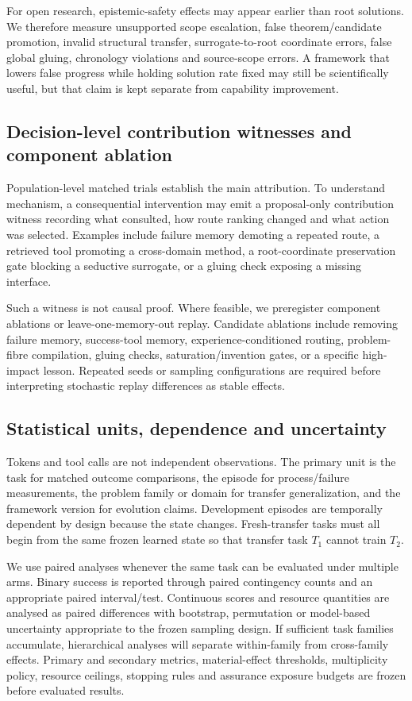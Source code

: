For open research, epistemic-safety effects may appear earlier than root solutions. We therefore measure unsupported scope escalation, false theorem/candidate promotion, invalid structural transfer, surrogate-to-root coordinate errors, false global gluing, chronology violations and source-scope errors. A framework that lowers false progress while holding solution rate fixed may still be scientifically useful, but that claim is kept separate from capability improvement.

\subsection{Decision-level contribution witnesses and component ablation}

Population-level matched trials establish the main attribution. To understand mechanism, a consequential intervention may emit a proposal-only contribution witness recording what \RAKL{} consulted, how route ranking changed and what action was selected. Examples include failure memory demoting a repeated route, a retrieved tool promoting a cross-domain method, a root-coordinate preservation gate blocking a seductive surrogate, or a gluing check exposing a missing interface.

Such a witness is not causal proof. Where feasible, we preregister component ablations or leave-one-memory-out replay. Candidate ablations include removing failure memory, success-tool memory, experience-conditioned routing, problem-fibre compilation, gluing checks, saturation/invention gates, or a specific high-impact lesson. Repeated seeds or sampling configurations are required before interpreting stochastic replay differences as stable effects.

\subsection{Statistical units, dependence and uncertainty}

Tokens and tool calls are not independent observations. The primary unit is the task for matched outcome comparisons, the episode for process/failure measurements, the problem family or domain for transfer generalization, and the framework version for evolution claims. Development episodes are temporally dependent by design because the state changes. Fresh-transfer tasks must all begin from the same frozen learned state so that transfer task $T_1$ cannot train $T_2$.

We use paired analyses whenever the same task can be evaluated under multiple arms. Binary success is reported through paired contingency counts and an appropriate paired interval/test. Continuous scores and resource quantities are analysed as paired differences with bootstrap, permutation or model-based uncertainty appropriate to the frozen sampling design. If sufficient task families accumulate, hierarchical analyses will separate within-family from cross-family effects. Primary and secondary metrics, material-effect thresholds, multiplicity policy, resource ceilings, stopping rules and assurance exposure budgets are frozen before evaluated results.

